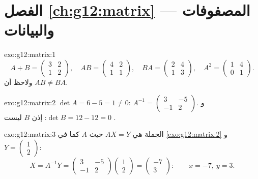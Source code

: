 \section*{الفصل \ref{ch:g12:matrix} --- المصفوفات والبيانات}

\begin{solution}{exo:g12:matrix:1}
\[
A + B = \begin{pmatrix} 3 & 2\\ 1 & 2\end{pmatrix}, \quad
AB = \begin{pmatrix} 4 & 2\\ 1 & 1\end{pmatrix}, \quad
BA = \begin{pmatrix} 2 & 4\\ 1 & 3\end{pmatrix}, \quad
A^2 = \begin{pmatrix} 1 & 4\\ 0 & 1\end{pmatrix}.
\]
ولاحظ أن $AB \neq BA$.
\end{solution}

\begin{solution}{exo:g12:matrix:2}
$\det A = 6 - 5 = 1 \neq 0$:
$A^{-1} = \begin{pmatrix} 3 & -5\\ -1 & 2 \end{pmatrix}$.
و $\det B = 12 - 12 = 0$: إذن $B$ ليست .
\end{solution}

\begin{solution}{exo:g12:matrix:3}
الجملة هي $AX = Y$ حيث $A$ كما في \cref{exo:g12:matrix:2} و
$Y = \begin{pmatrix} 1\\ 2\end{pmatrix}$:
\[
X = A^{-1}Y = \begin{pmatrix} 3 & -5\\ -1 & 2\end{pmatrix}
\begin{pmatrix} 1\\ 2\end{pmatrix}
= \begin{pmatrix} -7\\ 3\end{pmatrix}:
\qquad x = -7,\ y = 3 .
\]
\end{solution}

